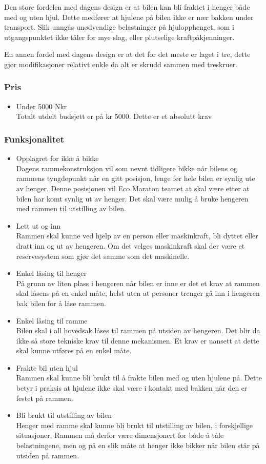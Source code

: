 Den store fordelen med dagens design er at bilen kan bli fraktet i henger både med og uten hjul. Dette medfører at hjulene på bilen ikke er nær bakken under transport. Slik unngås unødvendige belastninger på hjulopphenget, som i utgangspunktet ikke tåler for mye slag, eller plutselige kraftpåkjenninger. 

En annen fordel med dagens design er at det for det meste er laget i tre, dette gjør modifikasjoner relativt enkle da alt er skrudd sammen med treskruer.

\subsubsection{Pris}
\begin{itemize}
\item Under 5000 Nkr \\
Totalt utdelt budsjett er på kr 5000. Dette er et absolutt krav
\end{itemize}
\subsubsection{Funksjonalitet}
\begin{itemize}
\item Opplagret for ikke å bikke \\
Dagens rammekonstruksjon vil som nevnt tidligere bikke når bilens og rammens tyngdepunkt når en gitt posisjon, lenge før hele bilen er synlig ute av henger. Denne posisjonen vil Eco Maraton teamet at skal være etter at bilen har komt synlig ut av henger. Det skal være mulig å bruke hengeren med rammen til utstilling av bilen. 
\item Lett ut og inn \\
Rammen skal kunne ved hjelp av en person eller maskinkraft, bli dyttet eller dratt inn og ut av hengeren. Om det velges maskinkraft skal der være et reservesystem som gjør det samme som det maskinelle. 
\item Enkel låsing til henger \\
På grunn av liten plass i hengeren når bilen er inne er det et krav at rammen skal låsens på en enkel måte, helst uten at personer trenger gå inn i hengeren bak bilen for å låse rammen. 
\item Enkel låsing til ramme \\
Bilen skal i all hovedsak låses til rammen på utsiden av hengeren. Det blir da ikke så store tekniske krav til denne mekanismen. Et krav er uansett at dette skal kunne utføres på en enkel måte.
\item Frakte bil uten hjul \\
Rammen skal kunne bli brukt til å frakte bilen med og uten hjulene på. Dette betyr i praksis at hjulene ikke skal være i kontakt med bakken når den er festet på rammen. 
\item Bli brukt til utstilling av bilen \\
Henger med ramme skal kunne bli brukt til utstilling av bilen, i forskjellige situasjoner. Rammen må derfor være dimensjonert for både å tåle belastningene, men og på en slik måte at henger ikke bikker når bilen står på utsiden på rammen.
\end{itemize}
